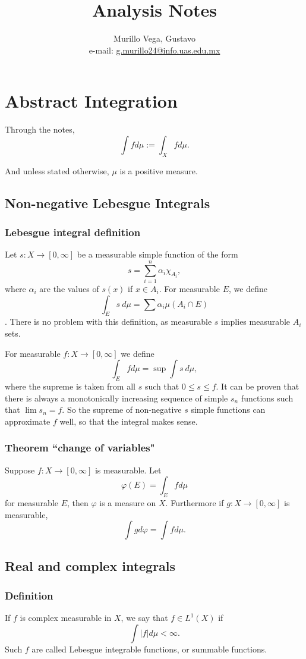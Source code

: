 \documentclass[oneside]{book}
\title{Analysis Notes}
\author{Murillo Vega, Gustavo \\ e-mail:
\href{mailto:g.murillo24@info.uas.edu.mx}{g.murillo24@info.uas.edu.mx}}
\begin{document}
\maketitle

\chapter{Abstract Integration}
Through the notes,
$$\int f d\mu := \int_X f d\mu.$$

And unless stated otherwise, $\mu$ is a positive measure.

\section{Non-negative Lebesgue Integrals}

\subsection{Lebesgue integral definition}
Let $s:X\rightarrow [0,\infty]$ be a measurable simple
function of the form
$$s=\sum_{i=1}^{n}\alpha_i\chi_{A_i},$$
where $\alpha_i$ are the values of $s(x)$ if $x\in A_i$.
For measurable $E$, we define
$$\int_E s\ d\mu = \sum\alpha_i\mu(A_i\cap E)$$.
There is no problem with this definition, as measurable $s$
implies measurable $A_i$ sets.

For measurable $f:X\rightarrow [0,\infty]$ we define
$$\int_E f d\mu = \sup \int s\ d\mu,$$
where the supreme is taken from all $s$ such that
$0\leq s\leq f$. It can be proven that there is always
a monotonically increasing sequence of simple $s_n$ functions
such that $\lim s_n = f$. So the supreme of non-negative
$s$ simple functions can approximate $f$ well, so that
the integral makes sense.

\subsection{Theorem ``change of variables"}
Suppose $f:X\rightarrow [0,\infty]$ is measurable.
Let
$$\varphi(E) = \int_E fd\mu$$
for measurable $E$, then $\varphi$ is a measure on $X$.
Furthermore if $g:X\rightarrow[0,\infty]$ is measurable,
$$\int gd\varphi = \int fd\mu.$$


\section{Real and complex integrals}

\subsection{Definition}
If $f$ is complex measurable in $X$, we say that $f\in L^1(X)$
if
$$\int |f| d\mu < \infty.$$
Such $f$ are called Lebesgue integrable functions, or
summable functions.
\end{document}
